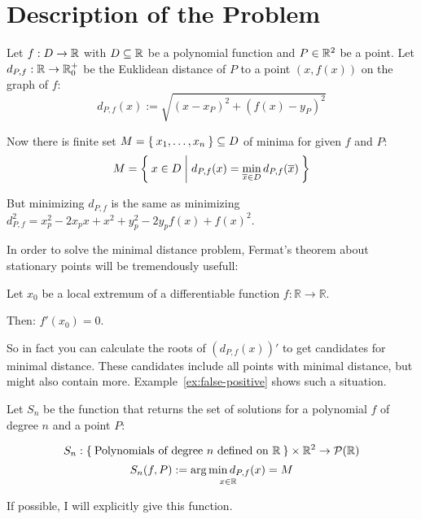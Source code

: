 \chapter{Description of the Problem}
Let $f: D \rightarrow \mathbb{R}$ with $D \subseteq \mathbb{R}$ be a polynomial function and $P \in \mathbb{R}^2$
be a point. Let $d_{P,f}: \mathbb{R} \rightarrow \mathbb{R}_0^+$
be the Euklidean distance of $P$ to a point $\left (x, f(x) \right )$
on the graph of $f$:
\[d_{P,f} (x) := \sqrt{(x - x_P)^2 + (f(x) - y_P)^2}\]

Now there is finite set $M = \Set{x_1, \dots, x_n} \subseteq D$ of minima for given $f$ and $P$:
\[M = \Set{x \in D | d_{P,f}(x) = \min_{\overline{x} \in D} d_{P,f}(\overline{x})}\] 

But minimizing $d_{P,f}$ is the same as minimizing 
$d_{P,f}^2 = x_p^2 - 2x_p x + x^2 + y_p^2 - 2y_p f(x) + f(x)^2$.

In order to solve the minimal distance problem, Fermat's theorem
about stationary points will be tremendously usefull:

\begin{theorem}\label{thm:fermats-theorem}
    Let $x_0$ be a local extremum of a differentiable function $f: \mathbb{R} \rightarrow \mathbb{R}$.

    Then: $f'(x_0) = 0$.
\end{theorem}

So in fact you can calculate the roots of $(d_{P,f}(x))'$ to get
candidates for minimal distance. These candidates include all points
with minimal distance, but might also contain more. Example~\ref{ex:false-positive}
shows such a situation.

Let $S_n$ be the function that returns the set of solutions for a
polynomial $f$ of degree $n$ and a point $P$:

\[S_n: \Set{\text{Polynomials of degree } n \text{ defined on } \ensuremath{\mathbb{R}}} \times \mathbb{R}^2 \rightarrow \mathcal{P}({\mathbb{R}})\]
\[S_n(f, P) := \underset{x\in\mathbb{R}}{\arg \min d_{P,f}(x)} = M\]

If possible, I will explicitly give this function.
